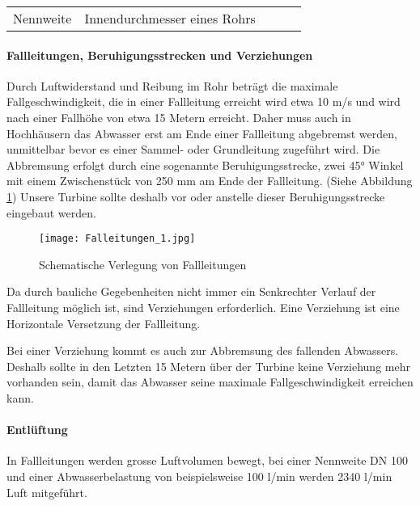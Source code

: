 \begin{table}[H]
\begin{tabular}{|l|l|lll}
Nennweite     & Innendurchmesser eines Rohrs                                                                                                                                                                                                                        &  &  &  \\ \cline{1-2}

\end{tabular}

\end{table}

\paragraph{Fallleitungen, Beruhigungsstrecken und Verziehungen}
Durch Luftwiderstand und Reibung im Rohr beträgt die maximale Fallgeschwindigkeit, die in einer Fallleitung erreicht wird etwa 10 m/s und wird nach einer Fallhöhe von etwa 15 Metern erreicht. Daher muss auch in Hochhäusern das Abwasser erst am Ende einer Fallleitung abgebremst werden, unmittelbar bevor es einer Sammel- oder Grundleitung zugeführt wird. Die Abbremsung erfolgt durch eine sogenannte Beruhigungsstrecke, zwei 45° Winkel mit einem Zwischenstück von 250 mm am Ende der Fallleitung. (Siehe Abbildung \ref{fig:Falleitungen}) Unsere Turbine sollte deshalb vor oder anstelle dieser Beruhigungsstrecke eingebaut werden.
\cite{baunetzwissen}

\begin{figure}[H]
	\centering
	\texttt{[image: Falleitungen\_1.jpg]}
	\caption{Schematische Verlegung von Fallleitungen \cite{baunetzwissen}}
	\label{fig:Falleitungen}
	
\end{figure}

Da durch bauliche Gegebenheiten nicht immer ein Senkrechter Verlauf der Fallleitung möglich ist, sind Verziehungen erforderlich. Eine Verziehung ist eine Horizontale Versetzung der Fallleitung. \cite{docplayer}

Bei einer Verziehung kommt es auch zur Abbremsung des fallenden Abwassers. Deshalb sollte in den Letzten 15 Metern über der Turbine keine Verziehung mehr vorhanden sein, damit das Abwasser seine maximale Fallgeschwindigkeit erreichen kann.

\paragraph{Entlüftung}
In Fallleitungen werden grosse Luftvolumen bewegt, bei einer Nennweite DN 100 und einer Abwasserbelastung von beispielsweise 100 l/min werden 2340 l/min Luft mitgeführt.
\cite{docplayer}

